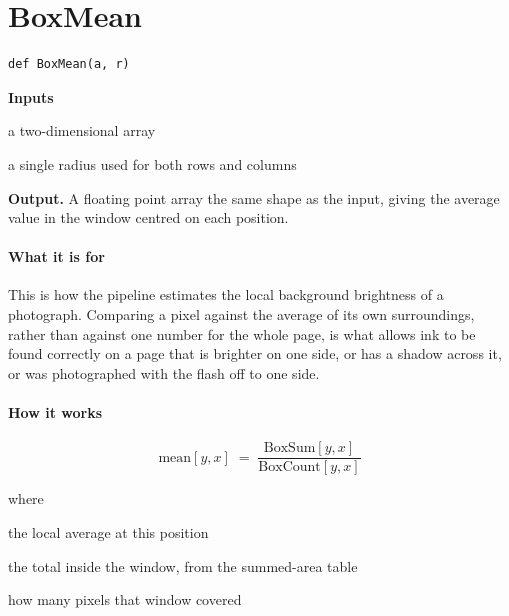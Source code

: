 \section{BoxMean}
\begin{lstlisting}[style=sig]
def BoxMean(a, r)
\end{lstlisting}

\noindent\textbf{Inputs}
\begin{description}[leftmargin=2.2em,style=nextline,font=\normalfont\ttfamily]\setlength\itemsep{1pt}
  \item[{img}] \normalfont a two-dimensional array
  \item[{r}] \normalfont a single radius used for both rows and columns
\end{description}

\noindent\textbf{Output.} A floating point array the same shape as the input, giving the average value in the window centred on each position.


\paragraph{What it is for}
This is how the pipeline estimates the local background brightness of a photograph. Comparing a pixel against the average of its own surroundings, rather than against one number for the whole page, is what allows ink to be found correctly on a page that is brighter on one side, or has a shadow across it, or was photographed with the flash off to one side.


\paragraph{How it works}

\begin{equation}
\mathrm{mean}[y,x] \;=\; \frac{\mathrm{BoxSum}[y,x]}{\mathrm{BoxCount}[y,x]}
\end{equation}

\noindent where
\begin{description}[leftmargin=2.4em,style=nextline,font=\normalfont\ttfamily]\setlength\itemsep{1pt}
  \item[{$\mathrm{mean}[y,x]$}] \normalfont the local average at this position
  \item[{$\mathrm{BoxSum}[y,x]$}] \normalfont the total inside the window, from the summed-area table
  \item[{$\mathrm{BoxCount}[y,x]$}] \normalfont how many pixels that window covered
\end{description}


